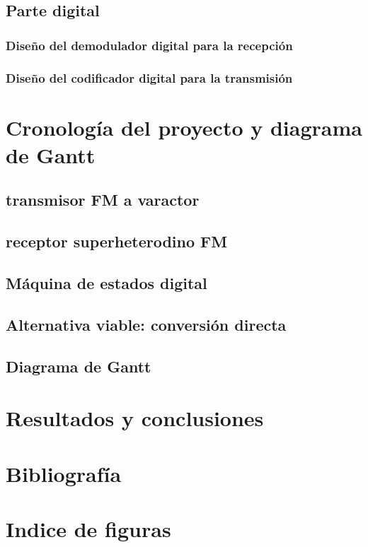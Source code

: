 \documentclass[11pt, a4paper]{article} %
\begin{document}
   \subsection{Parte digital}
   
   \subsubsection{Diseño del demodulador digital para la recepci\'on}
   
   \subsubsection{Diseño del codificador digital para la transmisi\'on}
   \label{sec:des_digital_tx}
   
%   

\newpage
\section{Cronolog\'ia del proyecto y diagrama de Gantt}
   
   \subsection{transmisor FM a varactor}
   
   \subsection{receptor superheterodino FM}
   
   \subsection{M\'aquina de estados digital}
   \label{sec:crono_digital}
   
   \subsection{Alternativa viable: conversi\'on directa}
   
   \subsection{Diagrama de Gantt}
   
\newpage

\section{Resultados y conclusiones}
   

\newpage
\section{Bibliografía}
   

\section{Indice de figuras}
\listoffigures
\end{document}
